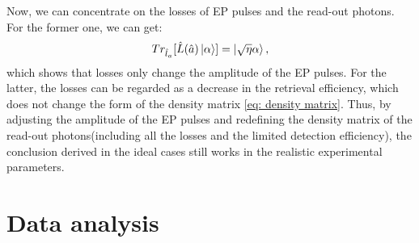 \documentclass[aps,reprint,showpacs,superscriptaddress]{revtex4-2}
\begin{document}
Now, we can concentrate on the losses of EP pulses and the read-out photons. For the former one, we can get:
\begin{equation}
	Tr_{\hat{l}_a}[\hat{L}(\hat{a})\ket{\alpha}]=\ket{\sqrt{\eta}\alpha},
\end{equation}
which shows that losses only change the amplitude of the EP pulses. For the latter, the losses can be regarded as a decrease in the retrieval efficiency, which does not change the form of the density matrix \ref{eq: density matrix}. Thus, by adjusting the amplitude of the EP pulses and redefining the density matrix of the read-out photons(including all the losses and the limited detection efficiency), the conclusion derived in the ideal cases still works in the realistic experimental parameters.

\section{Data analysis}
\end{document}
